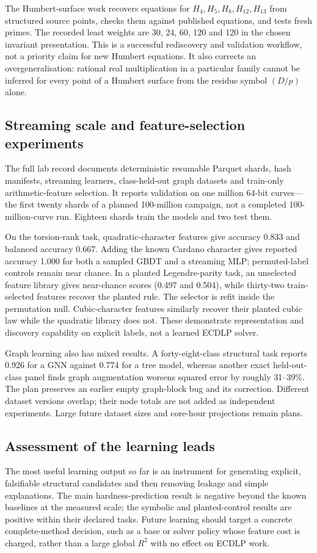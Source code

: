 The Humbert-surface work recovers equations for $H_4,H_5,H_8,H_{12},H_{13}$
from structured source points, checks them against published equations,
and tests fresh primes. The recorded least weights are 30, 24, 60, 120
and 120 in the chosen invariant presentation. This is a successful
rediscovery and validation workflow, not a priority claim for new
Humbert equations. It also corrects an overgeneralisation: rational real
multiplication in a particular family cannot be inferred for every
point of a Humbert surface from the residue symbol $(D/p)$ alone.

\subsection{Streaming scale and feature-selection experiments}

The full lab record documents deterministic resumable Parquet shards,
hash manifests, streaming learners, class-held-out graph datasets and
train-only arithmetic-feature selection. It reports validation on one
million 64-bit curves---the first twenty shards of a planned 100-million
campaign, not a completed 100-million-curve run. Eighteen shards train
the models and two test them.

On the torsion-rank task, quadratic-character features give accuracy
0.833 and balanced accuracy 0.667. Adding the known Cardano character
gives reported accuracy 1.000 for both a sampled GBDT and a streaming MLP;
permuted-label controls remain near chance. In a planted Legendre-parity
task, an unselected feature library gives near-chance scores (0.497 and
0.504), while thirty-two train-selected features recover the planted rule.
The selector is refit inside the permutation null. Cubic-character
features similarly recover their planted cubic law while the quadratic
library does not. These demonstrate representation and discovery
capability on explicit labels, not a learned ECDLP solver.

Graph learning also has mixed results. A forty-eight-class structural
task reports 0.926 for a GNN against 0.774 for a tree model, whereas
another exact held-out-class panel finds graph augmentation worsens
squared error by roughly 31--39\%. The plan preserves an earlier empty
graph-block bug and its correction. Different dataset versions overlap;
their node totals are not added as independent experiments. Large future
dataset sizes and core-hour projections remain plans.

\subsection{Assessment of the learning leads}

The most useful learning output so far is an instrument for generating
explicit, falsifiable structural candidates and then removing leakage
and simple explanations. The main hardness-prediction result is
negative beyond the known baselines at the measured scale; the symbolic
and planted-control results are positive within their declared tasks.
Future learning should target a concrete complete-method decision, such
as a base or solver policy whose feature cost is charged, rather than a
large global $R^2$ with no effect on ECDLP work.
